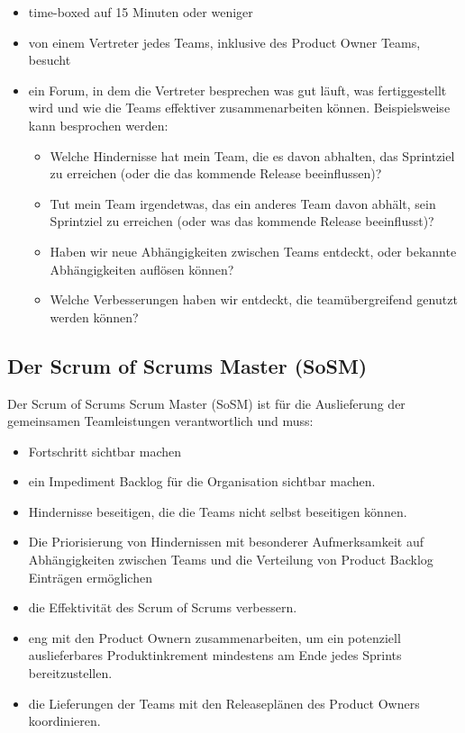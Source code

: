 \documentclass[12pt,a4paper,parskip=full]{scrartcl}
\begin{document}
\begin{itemize}
\item time-boxed auf 15 Minuten oder weniger
\item von einem Vertreter jedes Teams, inklusive des Product Owner Teams, besucht
\item ein Forum, in dem die Vertreter besprechen was gut läuft, was fertiggestellt wird und wie die Teams effektiver zusammenarbeiten können. Beispielsweise kann besprochen werden:
\begin{itemize}
\item Welche Hindernisse hat mein Team, die es davon abhalten, das Sprintziel zu erreichen (oder die das kommende Release beeinflussen)?
\item Tut mein Team irgendetwas, das ein anderes Team davon abhält, sein Sprintziel zu erreichen (oder was das kommende Release beeinflusst)?
\item Haben wir neue Abhängigkeiten zwischen Teams entdeckt, oder bekannte Abhängigkeiten auflösen können?
\item Welche Verbesserungen haben wir entdeckt, die teamübergreifend genutzt werden können?
\end{itemize}
\end{itemize}

\subsection{Der Scrum of Scrums Master (SoSM)}
Der Scrum of Scrums Scrum Master (SoSM) ist für die Auslieferung der gemeinsamen Teamleistungen verantwortlich und muss:
\begin{itemize}
\item Fortschritt sichtbar machen
\item ein Impediment Backlog für die Organisation sichtbar machen.
\item Hindernisse beseitigen, die die Teams nicht selbst beseitigen können.
\item Die Priorisierung von Hindernissen mit besonderer Aufmerksamkeit auf Abhängigkeiten zwischen Teams und die Verteilung von Product Backlog Einträgen ermöglichen
\item die Effektivität des Scrum of Scrums verbessern.
\item eng mit den Product Ownern zusammenarbeiten, um ein potenziell auslieferbares Produktinkrement mindestens am Ende jedes Sprints bereitzustellen.
\item die Lieferungen der Teams mit den Releaseplänen des Product Owners koordinieren.
\end{itemize}
\end{document}

